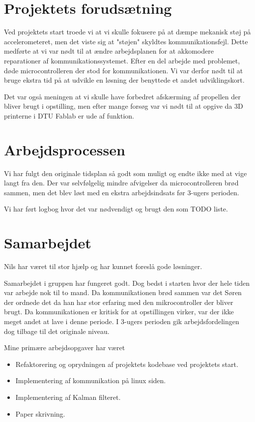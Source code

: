 

\section*{Projektets forudsætning}
Ved projektets start troede vi at vi skulle fokusere på at dæmpe mekanisk støj på accelerometeret, men det viste sig at "støjen" skyldtes kommunikationsfejl.
Dette medførte at vi var nødt til at ændre arbejdsplanen for at akkomodere reparationer af kommunikationssystemet. Efter en del arbejde med problemet, døde
microcontrolleren der stod for kommunikationen. Vi var derfor nødt til at bruge ekstra tid på at udvikle en løsning der benyttede et andet udviklingskort.

Det var også meningen at vi skulle have forbedret afskærming af propellen der bliver brugt i opstilling, men efter mange forsøg var vi nødt til at opgive da 
3D printerne i DTU Fablab er ude af funktion.

\section*{Arbejdsprocessen}
Vi har fulgt den originale tidsplan så godt som muligt og endte ikke med at vige langt fra den. Der var selvfølgelig mindre afvigelser da microcontrolleren brød
sammen, men det blev løst med en ekstra arbejdsindsats før 3-ugers perioden. 

Vi har ført logbog hvor det var nødvendigt og brugt den som TODO liste.

\section*{Samarbejdet}
Nils har været til stor hjælp og har kunnet foreslå gode løsninger.

Samarbejdet i gruppen har fungeret godt. Dog bedst i starten hvor der hele tiden var arbejde nok til to mand. Da kommunikationen brød sammen var det Søren der
ordnede det da han har stor erfaring med den mikrocontroller der bliver brugt. Da kommunikationen er kritisk for at opstillingen virker, var der ikke meget andet
at lave i denne periode. I 3-ugers perioden gik arbejdsfordelingen dog tilbage til det originale niveau.

Mine primære arbejdsopgaver har været
\begin{itemize}
	\item Refaktorering og oprydningen af projektets kodebase ved projektets start.
	\item Implementering af kommunikation på linux siden.
	\item Implementering af Kalman filteret.
	\item Paper skrivning.
\end{itemize}

